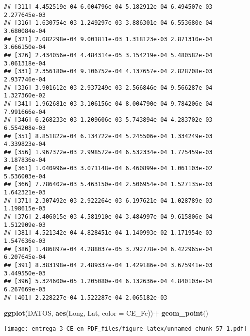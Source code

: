 \documentclass[
]{article}
\newenvironment{Shaded}{\begin{snugshade}}{\end{snugshade}}
\newcommand{\DataTypeTok}[1]{\textcolor[rgb]{0.13,0.29,0.53}{#1}}
\newcommand{\DecValTok}[1]{\textcolor[rgb]{0.00,0.00,0.81}{#1}}
\newcommand{\KeywordTok}[1]{\textcolor[rgb]{0.13,0.29,0.53}{\textbf{#1}}}
\newcommand{\NormalTok}[1]{#1}
\newcommand{\OperatorTok}[1]{\textcolor[rgb]{0.81,0.36,0.00}{\textbf{#1}}}
\newcommand{\StringTok}[1]{\textcolor[rgb]{0.31,0.60,0.02}{#1}}
\begin{document}
\begin{verbatim}
## [311] 4.452519e-04 6.004796e-04 5.182912e-04 6.494507e-03 2.277645e-03
## [316] 1.630754e-03 1.249297e-03 3.886301e-04 6.553680e-04 3.680084e-04
## [321] 2.082298e-04 9.001811e-03 1.318123e-03 2.871310e-04 3.666150e-04
## [326] 2.434056e-04 4.484314e-05 3.154219e-04 5.480582e-04 3.061318e-04
## [331] 2.356180e-04 9.106752e-04 4.137657e-04 2.828708e-03 2.937746e-04
## [336] 3.901612e-03 2.937249e-03 2.566846e-04 9.566287e-04 1.327360e-02
## [341] 1.962681e-03 3.106156e-04 8.004790e-04 9.784206e-04 7.991666e-04
## [346] 6.268233e-03 1.209606e-03 5.743894e-04 4.283702e-03 6.554208e-03
## [351] 8.851822e-04 6.134722e-04 5.245506e-04 1.334249e-03 4.339823e-04
## [356] 1.967372e-03 2.998572e-04 6.532334e-04 1.775459e-03 3.187836e-04
## [361] 1.040996e-03 3.071148e-04 6.460899e-04 1.061103e-02 5.536003e-04
## [366] 7.786402e-03 5.463150e-04 2.506954e-04 1.527135e-03 1.642321e-03
## [371] 2.307492e-03 2.922264e-03 6.197621e-04 1.028789e-03 1.198615e-03
## [376] 2.406015e-03 4.581910e-04 3.484997e-04 9.615806e-04 1.512909e-03
## [381] 4.521342e-04 4.828451e-04 1.140993e-02 1.171954e-03 1.547636e-03
## [386] 1.486897e-04 4.288037e-05 3.792778e-04 6.422965e-04 6.207645e-04
## [391] 8.383198e-04 2.489337e-04 1.429186e-04 3.675941e-03 3.449550e-03
## [396] 5.324600e-05 1.205080e-04 6.132636e-04 4.840103e-04 6.267669e-03
## [401] 2.228227e-04 1.522287e-04 2.065182e-03
\end{verbatim}

\begin{Shaded}
\begin{Highlighting}[]
\KeywordTok{ggplot}\NormalTok{(DATOS, }\KeywordTok{aes}\NormalTok{(Long, Lat, }\DataTypeTok{color =}\NormalTok{ CE_Fe))}\OperatorTok{+}
\StringTok{  }\KeywordTok{geom_point}\NormalTok{()}
\end{Highlighting}
\end{Shaded}

\texttt{[image: entrega-3-CE-en-PDF\_files/figure-latex/unnamed-chunk-57-1.pdf]}

\begin{Shaded}
\end{Shaded}
\end{document}
